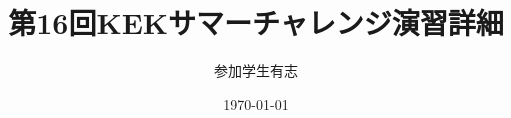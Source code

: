 \documentclass[dvipdfmx]{jsarticle}
\begin{document}
\title{第16回KEKサマーチャレンジ演習詳細}
\author{参加学生有志}
\date{\today}
\begin{titlepage}
    \maketitle
    \thispagestyle{empty}
\end{titlepage}


\pagebreak
\end{document}
